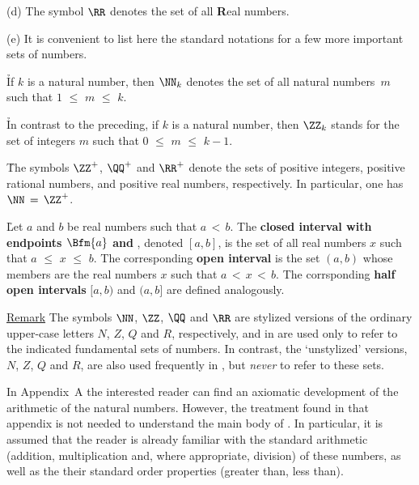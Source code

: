 \V

        (d) The symbol ${\RR}$ denotes the set of all {\bf R}eal numbers.

\V

        (e) It is convenient to list here the standard notations for a few more important sets of numbers.

        \h If $k$ is a natural number, then ${\NN}_{k}$ denotes the set of all natural numbers~$m$ such that $1\,\,{\leq}\,\,m\,\,{\leq}\,\,k$.

        \h In contrast to the preceding, if $k$ is a natural number, then ${\ZZ}_{k}$ stands for the set of integers $m$ such that $0\,\,{\leq}\,\,m\,\,{\leq}\,\,k-1$.

        \h The symbols ${\ZZ}^{+}$, ${\QQ}^{+}$ and ${\RR}^{+}$ denote the sets of positive integers, positive rational numbers,
    and positive real numbers, respectively. In particular, one has ${\NN} \,=\, {\ZZ}^{+}$.

        \h Let $a$ and $b$ be real numbers such that $a\,<\,b$. The {\bf closed interval with endpoints $\Bfm{a}$ and },
    denoted $[a,b]$, is the set of all real numbers $x$ such that $a\,\,{\leq}\,\,x\,\,{\leq}\,\,b$.
    The corresponding {\bf open interval} is the set $(a,b)$ whose members are the real numbers $x$ such that $a\,<\,x\,<\,b$.
    The corrsponding {\bf half open intervals} $[a,b)$ and $(a,b]$ are defined analogously.

        \underline{Remark} The symbols ${\NN}$, ${\ZZ}$, ${\QQ}$ and ${\RR}$ are stylized versions of the ordinary upper-case letters
    $N$, $Z$, $Q$ and $R$, respectively, and in {\TheseNotes} are used only to refer to the indicated fundamental sets of numbers.
    In contrast, the `unstylized' versions, $N$, $Z$, $Q$ and $R$, are also used frequently in {\TheseNotes}, but {\em never} to refer to these sets.

\V
        In Appendix~A the interested reader can find an axiomatic development of the arithmetic of the natural numbers.
    However, the treatment found in that appendix is not needed to understand the main body of {\ThisText}.
    In particular, it is assumed that the reader is already familiar with the standard arithmetic (addition, multiplication and,
    where appropriate, division) of these numbers, as well as the their standard order properties (greater than, less than).

\VV

